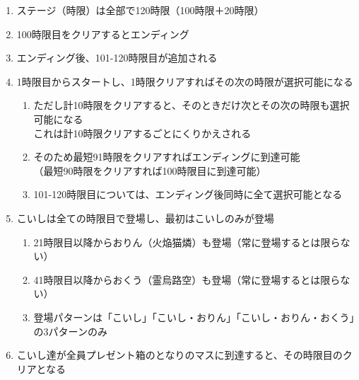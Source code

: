 \clearpage
\begin{enumerate}[label={\sarrow}]
\item ステージ（時限）は全部で120時限（100時限＋20時限）
\item 100時限目をクリアするとエンディング
\item エンディング後、101-120時限目が追加される
\item 1時限目からスタートし、1時限クリアすればその次の時限が選択可能になる
  \begin{enumerate}[label={\sarrow}]
  \item ただし計10時限をクリアすると、そのときだけ次とその次の時限も選択可能になる\\
        これは計10時限クリアするごとにくりかえされる
  \item そのため最短91時限をクリアすればエンディングに到達可能\\
        （最短90時限をクリアすれば100時限目に到達可能）
  \item 101-120時限目については、エンディング後同時に全て選択可能となる
  \end{enumerate}
\item こいしは全ての時限目で登場し、最初はこいしのみが登場
  \begin{enumerate}[label={\sarrow}]
  \item 21時限目以降からおりん（火焔猫燐）も登場（常に登場するとは限らない）
  \item 41時限目以降からおくう（霊烏路空）も登場（常に登場するとは限らない）
  \item 登場パターンは「こいし」「こいし・おりん」「こいし・おりん・おくう」の3パターンのみ
  \end{enumerate}
\item こいし達が全員プレゼント箱のとなりのマスに到達すると、その時限目のクリアとなる
\end{enumerate}





